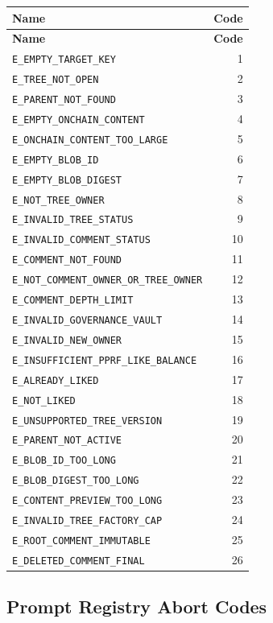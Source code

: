 \documentclass[11pt]{article}
\newcommand{\code}[1]{\texttt{#1}}
\begin{document}
\begin{longtable}{lr}
\toprule
\textbf{Name} & \textbf{Code} \\
\midrule
\endfirsthead
\toprule
\textbf{Name} & \textbf{Code} \\
\midrule
\endhead
\code{E\_EMPTY\_TARGET\_KEY} & 1 \\
\code{E\_TREE\_NOT\_OPEN} & 2 \\
\code{E\_PARENT\_NOT\_FOUND} & 3 \\
\code{E\_EMPTY\_ONCHAIN\_CONTENT} & 4 \\
\code{E\_ONCHAIN\_CONTENT\_TOO\_LARGE} & 5 \\
\code{E\_EMPTY\_BLOB\_ID} & 6 \\
\code{E\_EMPTY\_BLOB\_DIGEST} & 7 \\
\code{E\_NOT\_TREE\_OWNER} & 8 \\
\code{E\_INVALID\_TREE\_STATUS} & 9 \\
\code{E\_INVALID\_COMMENT\_STATUS} & 10 \\
\code{E\_COMMENT\_NOT\_FOUND} & 11 \\
\code{E\_NOT\_COMMENT\_OWNER\_OR\_TREE\_OWNER} & 12 \\
\code{E\_COMMENT\_DEPTH\_LIMIT} & 13 \\
\code{E\_INVALID\_GOVERNANCE\_VAULT} & 14 \\
\code{E\_INVALID\_NEW\_OWNER} & 15 \\
\code{E\_INSUFFICIENT\_PPRF\_LIKE\_BALANCE} & 16 \\
\code{E\_ALREADY\_LIKED} & 17 \\
\code{E\_NOT\_LIKED} & 18 \\
\code{E\_UNSUPPORTED\_TREE\_VERSION} & 19 \\
\code{E\_PARENT\_NOT\_ACTIVE} & 20 \\
\code{E\_BLOB\_ID\_TOO\_LONG} & 21 \\
\code{E\_BLOB\_DIGEST\_TOO\_LONG} & 22 \\
\code{E\_CONTENT\_PREVIEW\_TOO\_LONG} & 23 \\
\code{E\_INVALID\_TREE\_FACTORY\_CAP} & 24 \\
\code{E\_ROOT\_COMMENT\_IMMUTABLE} & 25 \\
\code{E\_DELETED\_COMMENT\_FINAL} & 26 \\
\bottomrule
\end{longtable}

\subsection{Prompt Registry Abort Codes}
\end{document}
